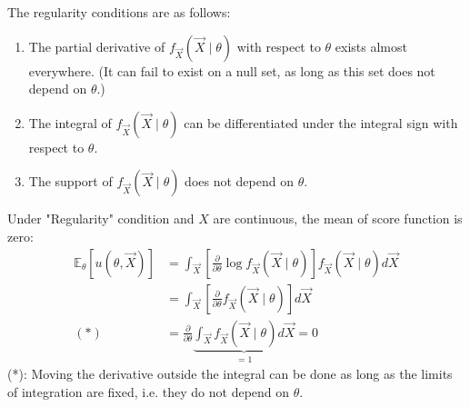 \documentclass[11pt]{elegantbook}
\begin{document}
\begin{definition}
    \normalfont
    The regularity conditions are as follows:
    \begin{enumerate}
        \item The partial derivative of $f_{\vec{X}}(\vec{X}\mid\theta)$ with respect to $\theta$ exists almost everywhere. (It can fail to exist on a null set, as long as this set does not depend on $\theta$.)
        \item The integral of $f_{\vec{X}}(\vec{X}\mid\theta)$ can be differentiated under the integral sign with respect to $\theta$.
        \item The support of $f_{\vec{X}}(\vec{X}\mid\theta)$ does not depend on $\theta$.
    \end{enumerate}
\end{definition}
\begin{lemma}
    \normalfont
    Under "Regularity" condition and $X$ are continuous, the mean of score function is zero:
    \begin{equation}
        \begin{aligned}
            \mathbb{E}_\theta\left[u(\theta,\vec{X})\right]&=\int_{\vec{X}} \left[\frac{\partial}{\partial \theta}\log f_{\vec{X}}(\vec{X}\mid\theta)\right]f_{\vec{X}}(\vec{X}\mid\theta) d\vec{X}\\
            &=\int_{\vec{X}}  \left[\frac{\partial}{\partial \theta}f_{\vec{X}}(\vec{X}\mid\theta)\right]d\vec{X}\\
            (*)\quad &=\frac{\partial}{\partial \theta}\underbrace{\int_{\vec{X}}  f_{\vec{X}}(\vec{X}\mid\theta)d\vec{X}}_{=1}=0
        \end{aligned}
        \nonumber
    \end{equation}
    (*): Moving the derivative outside the integral can be done as long as the limits of integration are fixed, i.e. they do not depend on $\theta$.
\end{lemma}
\end{document}
